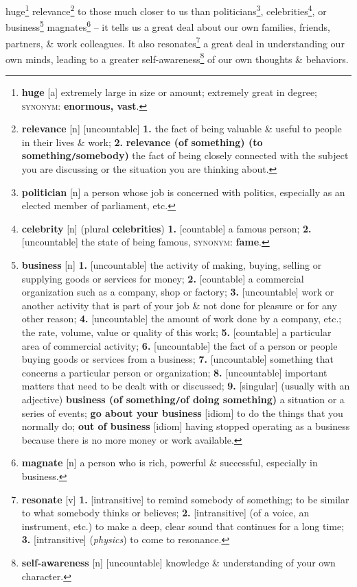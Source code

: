 \documentclass[oneside]{book}
\numberwithin{equation}{section}
\begin{document}
huge\footnote{\textbf{huge} [a] extremely large in size or amount; extremely great in degree; \textsc{synonym}: \textbf{enormous, vast}.} relevance\footnote{\textbf{relevance} [n] [uncountable] \textbf{1.} the fact of being valuable \& useful to people in their lives \& work; \textbf{2.} \textbf{relevance (of something) (to something\texttt{/}somebody)} the fact of being closely connected with the subject you are discussing or the situation you are thinking about.} to those much closer to us than politicians\footnote{\textbf{politician} [n] a person whose job is concerned with politics, especially as an elected member of parliament, etc.}, celebrities\footnote{\textbf{celebrity} [n] (plural \textbf{celebrities}) \textbf{1.} [countable] a famous person; \textbf{2.} [uncountable] the state of being famous, \textsc{synonym}: \textbf{fame}.}, or business\footnote{\textbf{business} [n] \textbf{1.} [uncountable] the activity of making, buying, selling or supplying goods or services for money; \textbf{2.} [countable] a commercial organization such as a company, shop or factory; \textbf{3.} [uncountable] work or another activity that is part of your job \& not done for pleasure or for any other reason; \textbf{4.} [uncountable] the amount of work done by a company, etc.; the rate, volume, value or quality of this work; \textbf{5.} [countable] a particular area of commercial activity; \textbf{6.} [uncountable] the fact of a person or people buying goods or services from a business; \textbf{7.} [uncountable] something that concerns a particular person or organization; \textbf{8.} [uncountable] important matters that need to be dealt with or discussed; \textbf{9.} [singular] (usually with an adjective) \textbf{business (of something\texttt{/}of doing something)} a situation or a series of events; \textbf{go about your business} [idiom] to do the things that you normally do; \textbf{out of business} [idiom] having stopped operating as a business because there is no more money or work available.} magnates\footnote{\textbf{magnate} [n] a person who is rich, powerful \& successful, especially in business.} -- it tells us a great deal about our own families, friends, partners, \& work colleagues. It also resonates\footnote{\textbf{resonate} [v] \textbf{1.} [intransitive] to remind somebody of something; to be similar to what somebody thinks or believes; \textbf{2.} [intransitive] (of a voice, an instrument, etc.) to make a deep, clear sound that continues for a long time; \textbf{3.} [intransitive] (\textit{physics}) to come to resonance.} a great deal in understanding our own minds, leading to a greater self-awareness\footnote{\textbf{self-awareness} [n] [uncountable] knowledge \& understanding of your own character.} of our own thoughts \& behaviors.
\end{document}
